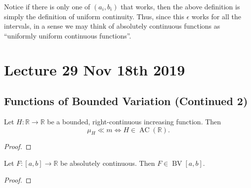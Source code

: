 \documentclass[notoc,notitlepage]{tufte-book}
\DeclareMathOperator{\AC}{AC}
\DeclareMathOperator{\BV}{BV}
\begin{document}
\begin{remark}
  Notice if there is only one of $(a_i, b_i)$ that works, then
  the above definition is simply the definition of uniform continuity.
  Thus, since this $\epsilon$ works for all the intervals, in a sense
  we may think of absolutely continuous functions as ``uniformly uniform
  continuous functions''.
\end{remark}



\chapter{Lecture 29 Nov 18th 2019}%
\label{chp:lecture_29_nov_18th_2019}

\section{Functions of Bounded Variation (Continued 2)}%
\label{sec:functions_of_bounded_variation_continued_2}

\begin{propo}\label{propo:measure_constructed_from_a_bounded_absolutely_continuous_increasing_right_continuous_function}
  Let $H : \mathbb{R} \to \mathbb{R}$ be a bounded, right-continuous increasing
  function. Then
  \begin{equation*}
    \mu_H \ll m \iff H \in \AC(\mathbb{R}).
  \end{equation*}
\end{propo}

\begin{proof}
\end{proof}

\begin{lemma}\label{lemma:absolutely_continuous_functions_are_of_bounded_variation}
  Let $F : [a, b] \to \mathbb{R}$ be absolutely continuous. Then
  $F \in \BV[a, b]$.
\end{lemma}

\begin{proof}
\end{proof}
\end{document}
